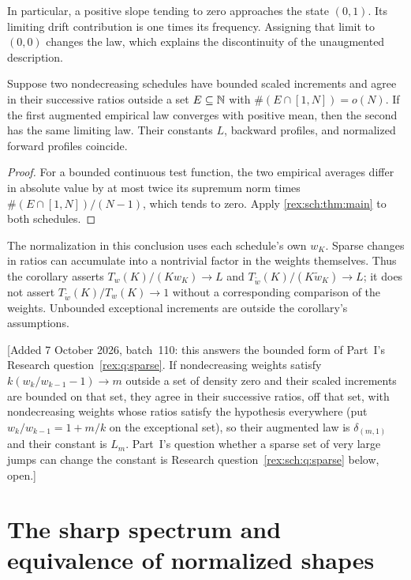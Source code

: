 In particular, a positive slope tending to zero approaches the
state $(0,1)$. Its limiting drift contribution is one times its
frequency. Assigning that limit to $(0,0)$ changes the law, which
explains the discontinuity of the unaugmented description.

\begin{corollary}
\label{rex:sch:cor:sparse}
Suppose two nondecreasing schedules have bounded scaled increments
and agree in their successive ratios outside a set
$E\subseteq\mathbb N$ with $\#(E\cap[1,N])=o(N)$. If the first
augmented empirical law converges with positive mean, then the
second has the same limiting law. Their constants $L$, backward
profiles, and normalized forward profiles coincide.
\end{corollary}

\begin{proof}
For a bounded continuous test function, the two empirical averages
differ in absolute value by at most twice its supremum norm times
$\#(E\cap[1,N])/(N-1)$, which tends to zero. Apply
\cref{rex:sch:thm:main} to both schedules.
\end{proof}

The normalization in this conclusion uses each schedule's own
$w_K$. Sparse changes in ratios can accumulate into a nontrivial
factor in the weights themselves. Thus the corollary asserts
$T_w(K)/(K w_K)\to L$ and
$T_{\widetilde w}(K)/(K\widetilde w_K)\to L$; it does not
assert $T_{\widetilde w}(K)/T_w(K)\to1$ without a corresponding
comparison of the weights. Unbounded exceptional increments are
outside the corollary's assumptions.

[Added 7 October 2026, batch~110: this answers the bounded form of Part~I's
Research question~\ref{rex:q:sparse}. If nondecreasing weights satisfy
$k(w_k/w_{k-1}-1)\to m$ outside a set of density zero and their scaled
increments are bounded on that set, they agree in their successive ratios,
off that set, with nondecreasing weights whose ratios satisfy the
hypothesis everywhere (put $w_k/w_{k-1}=1+m/k$ on the exceptional set), so
their augmented law is $\delta_{(m,1)}$ and their constant is $L_m$. Part~I's
question whether a sparse set of very large jumps can change the constant
is Research question~\ref{rex:sch:q:sparse} below, open.]

\section{The sharp spectrum and equivalence of normalized shapes}
\label{rex:sch:sec:spectrum}

